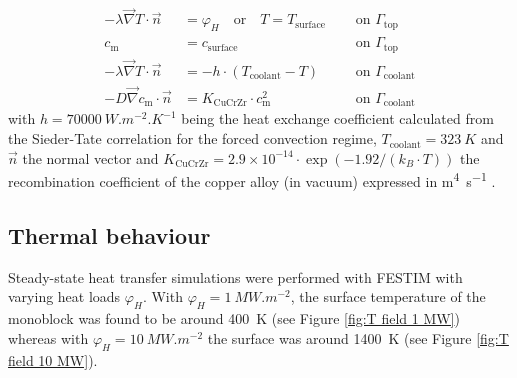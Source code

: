 \begin{subequations}
    \begin{align}
    -\lambda \vec{\nabla} T \cdot \vec{n} &=\varphi_{H} \quad \text{or} \quad T = T_\mathrm{surface}\quad &\text { on } \Gamma_\mathrm{top}\\
    c_\mathrm{m} &=  c_\mathrm{surface}\quad &\text { on } \Gamma_\mathrm{top}\\
    -\lambda \vec{\nabla} T\cdot \vec{n} &= -h \cdot \left(T_\mathrm{coolant} - T\right)\quad &\text { on } \Gamma_\mathrm{coolant}\\
    -D \vec{\nabla} c_\mathrm{m} \cdot \vec{n} &= K_\mathrm{CuCrZr} \cdot c_\mathrm{m}^{2} \quad &\text { on } \Gamma_\mathrm{coolant}
    \end{align}
\end{subequations}
with $h=\SI{70000}{W.m^{-2}.K^{-1}}$ being the heat exchange coefficient calculated from the Sieder-Tate correlation for the forced convection regime, $T_\mathrm{coolant}= \SI{323}{K}$ and $\vec{n}$ the normal vector and $K_\mathrm{CuCrZr} = 2.9 \times 10^{-14}\cdot \exp{(-1.92/(k_B\cdot T))}$ the recombination coefficient of the copper alloy (in vacuum) expressed in \si{m^4.s^{-1}} .


\subsection{Thermal behaviour}
Steady-state heat transfer simulations were performed with FESTIM with varying heat loads $\varphi_H$.
With $\varphi_H = \SI{1}{MW.m^{-2}}$, the surface temperature of the monoblock was found to be around \SI{400}{K} (see Figure \ref{fig:T field 1 MW}) whereas with $\varphi_H = \SI{10}{MW.m^{-2}}$ the surface was around \SI{1400}{K} (see Figure \ref{fig:T field 10 MW}).

